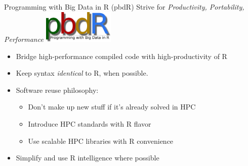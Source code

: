 \begin{frame}
  \begin{block}{Programming with Big Data in R (pbdR)}
    Strive for \emph{Productivity, Portability, Performance}
    \hfill\includegraphics[width=3.4cm]{../common/pics/simple} \\[1ex]
    \begin{itemize}[<+-|alert@+>]
    \item Bridge high-performance compiled code with
      high-productivity of R 
    \item Keep syntax \emph{identical} to R, when possible.
    \item Software reuse philosophy:
      \begin{itemize}
      \item Don't make up new stuff if it's already solved in HPC
      \item Introduce HPC standards with R flavor
      \item Use scalable HPC libraries with R convenience
      \end{itemize}
    \item Simplify and use R intelligence where possible
    \end{itemize}
  \end{block}
\end{frame}


